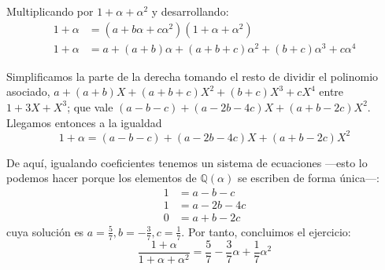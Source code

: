 \documentclass[a4paper, 11pt]{article}
\begin{document}
\begin{solucion}
\begin{apartado}
          Multiplicando por $1 + \alpha + \alpha^2$ y desarrollando:
          \begin{align*}
              1 + \alpha &= (a + b\alpha + c\alpha^2)(1 + \alpha + \alpha^2) \\
              1 + \alpha &= a + (a+b)\alpha + (a+b+c)\alpha^2 + (b+c)\alpha^3 + c\alpha^4
          \end{align*}

          Simplificamos la parte de la derecha tomando el resto de dividir el polinomio asociado, $ a + (a+b)X + (a+b+c)X^2 + (b+c)X^3 + cX^4$ entre $1+3X+X^3$; que vale $(a-b-c) + (a-2b-4c)X + (a+b-2c)X^2$. Llegamos entonces a la igualdad
          \[
          1 + \alpha = (a-b-c) + (a-2b-4c)X + (a+b-2c)X^2
          \]

          De aquí, igualando coeficientes tenemos un sistema de ecuaciones ---esto lo podemos hacer porque los elementos de $\mathbb{Q}(\alpha)$ se escriben de forma única---:
          \begin{align*}
              1 &= a-b-c \\
              1 &= a-2b-4c \\
              0 &= a+b-2c
          \end{align*}
          cuya solución es $a = \frac{5}{7}, b = -\frac{3}{7}, c = \frac{1}{7}$. Por tanto, concluimos el ejercicio:
          \[
          \frac{1+\alpha}{1+\alpha+\alpha^2} = \frac{5}{7} - \frac{3}{7}\alpha + \frac{1}{7}\alpha^2
          \]
      \end{apartado}
  \end{solucion}

  \begin{ejercicio}
  \end{ejercicio}
\end{document}
